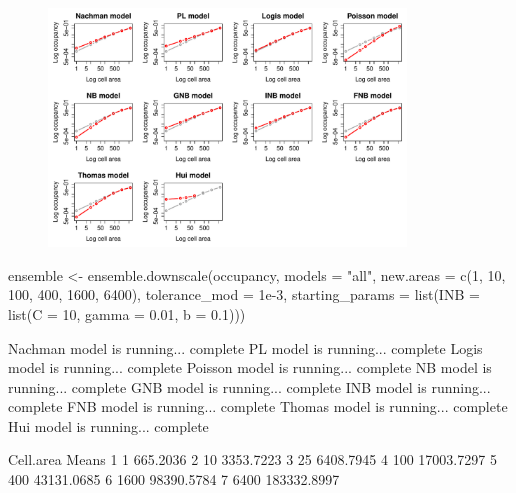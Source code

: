 \documentclass{article}[12pt, a4paper]
\begin{document}
\begin{figure}[!ht]
\centering
\includegraphics[width=9.5cm]{Downscaling-downscale41}
\end{figure}

\begin{Schunk}
\begin{Sinput}
ensemble <- ensemble.downscale(occupancy,
                               models = "all",
                               new.areas = c(1, 10, 100, 400, 1600, 6400),
                               tolerance_mod = 1e-3,
                               starting_params = list(INB = list(C = 10,
                                                                 gamma = 0.01,
                                                                 b = 0.1)))
\end{Sinput}
\begin{Soutput}
Nachman model is running...  complete 
PL model is running...  complete 
Logis model is running...  complete 
Poisson model is running...  complete 
NB model is running...  complete 
GNB model is running...  complete 
INB model is running...  complete 
FNB model is running...  complete 
Thomas model is running...  complete 
Hui model is running...  complete 
\end{Soutput}


\begin{Soutput}
  Cell.area       Means
1         1    665.2036
2        10   3353.7223
3        25   6408.7945
4       100  17003.7297
5       400  43131.0685
6      1600  98390.5784
7      6400 183332.8997
\end{Soutput}
\end{Schunk}
\end{document}
